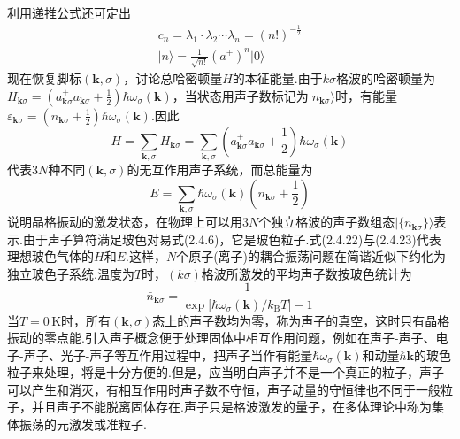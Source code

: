 利用递推公式还可定出
\begin{equation}
\begin{gathered}
  c_n=\lambda_1\cdot\lambda_2\cdots\lambda_n=(n!)^{-\frac{1}{2}}\\[1ex]
  \lvert n\rangle=\frac{1}{\sqrt{n!}}(a^{+})^n\lvert0\rangle
\end{gathered}
\end{equation}
现在恢复脚标$(\boldsymbol{k},\sigma)$，讨论总哈密顿量$H$的本征能量.由于$k\sigma$格波的哈密顿量为$H_{\boldsymbol{k}\sigma}=\left(a_{\boldsymbol{k}\sigma}^{+}a_{\boldsymbol{k}\sigma}+\frac{1}{2}\right)\allowbreak\hbar\omega_{\sigma}(\boldsymbol{k})$，当状态用声子数标记为$\lvert n_{\boldsymbol{k}\sigma}\rangle$时，有能量$\varepsilon_{\boldsymbol{k}\sigma}=\left(n_{\boldsymbol{k}\sigma}+\frac{1}{2}\right)\hbar\omega_{\sigma}(\boldsymbol{k})$.因此
\begin{equation}
  H=\sum_{\boldsymbol{k},\sigma}H_{\boldsymbol{k}\sigma}
  =\sum_{\boldsymbol{k},\sigma}\left(a_{\boldsymbol{k}\sigma}^{+}a_{\boldsymbol{k}\sigma}
  +\frac{1}{2}\right)\hbar\omega_{\sigma}(\boldsymbol{k})
\end{equation}
代表$3N$种不同$(\boldsymbol{k},\sigma)$的无互作用声子系统，而总能量为
\begin{equation}
  E=\sum_{\boldsymbol{k},\sigma}\hbar\omega_{\sigma}(\boldsymbol{k})
  \left(n_{\boldsymbol{k}\sigma}+\frac{1}{2}\right)
\end{equation}
说明晶格振动的激发状态，在物理上可以用$3N$个独立格波的声子数组态$\lvert\{n_{\boldsymbol{k}\sigma}\}\rangle$表示.由于声子算符满足玻色对易式(2.4.6)，它是玻色粒子.式(2.4.22)与(2.4.23)代表理想玻色气体的$H$和$E$.这样，$N$个原子(离子)的耦合振荡问题在简谐近似下约化为独立玻色子系统.温度为$T$时，$(k\sigma)$格波所激发的平均声子数按玻色统计为
\begin{equation}
  \bar{n}_{\boldsymbol{k}\sigma}
  =\frac{1}{\exp\bigl[\hbar\omega_{\sigma}(\boldsymbol{k})/k_{\mathrm{B}}T\bigr]-1}
\end{equation}
当$T=0\,$K时，所有$(\boldsymbol{k},\sigma)$态上的声子数均为零，称为声子的真空，这时只有晶格振动的零点能.引入声子概念便于处理固体中相互作用问题，例如在声子-声子、电子-声子、光子-声子等互作用过程中，把声子当作有能量$\hbar\omega_{\sigma}(\boldsymbol{k})$和动量$\hbar\boldsymbol{k}$的玻色粒子来处理，将是十分方便的.但是，应当明白声子并不是一个真正的粒子，声子可以产生和消灭，有相互作用时声子数不守恒，声子动量的守恒律也不同于一般粒子，并且声子不能脱离固体存在.声子只是格波激发的量子，在多体理论中称为集体振荡的元激发或准粒子.

